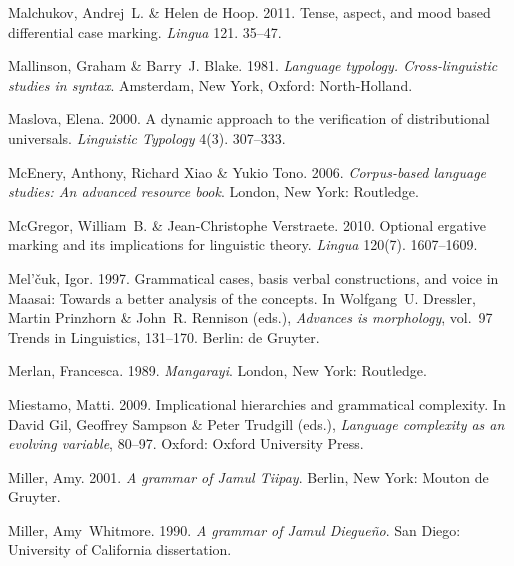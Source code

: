 \documentclass[ number=1
			   ,series=sidl
				,url=http://langsci-press.org/catalog/book/18 
			   ,isbn=978-3-944675-19-0
			   ,output=long   %
			  ]{LSP/langsci}
\begin{document}
\begin{thebibliography}{190}
Malchukov, Andrej~L. \& Helen {de Hoop}. 2011.
\newblock Tense, aspect, and mood based differential case marking.
\newblock \emph{Lingua} 121. 35--47.

Mallinson, Graham \& Barry~J. Blake. 1981.
\newblock \emph{Language typology. {C}ross-linguistic studies in syntax}.
\newblock Amsterdam, New York, Oxford: North-Holland.

Maslova, Elena. 2000.
\newblock A dynamic approach to the verification of distributional universals.
\newblock \emph{Linguistic Typology} 4(3). 307--333.

McEnery, Anthony, Richard Xiao \& Yukio Tono. 2006.
\newblock \emph{Corpus-based language studies: {A}n advanced resource book}.
\newblock London, New York: Routledge.

McGregor, William~B. \& Jean-Christophe Verstraete. 2010.
\newblock Optional ergative marking and its implications for linguistic theory.
\newblock \emph{Lingua} 120(7). 1607--1609.

Mel'\v{c}uk, Igor. 1997.
\newblock Grammatical cases, basis verbal constructions, and voice in {M}aasai:
  {T}owards a better analysis of the concepts.
\newblock In Wolfgang~U. Dressler, Martin Prinzhorn \& John~R. Rennison (eds.),
  \emph{Advances is morphology}, vol.~97 Trends in Linguistics, 131--170.
  Berlin: de Gruyter.

Merlan, Francesca. 1989.
\newblock \emph{{M}angarayi}.
\newblock London, New York: Routledge.
\enlargethispage{\baselineskip}


Miestamo, Matti. 2009.
\newblock Implicational hierarchies and grammatical complexity.
\newblock In David Gil, Geoffrey Sampson \& Peter Trudgill (eds.),
  \emph{Language complexity as an evolving variable}, 80--97. Oxford: Oxford
  University Press.

Miller, Amy. 2001.
\newblock \emph{A grammar of {J}amul {T}iipay}.
\newblock Berlin, New York: Mouton de Gruyter.

Miller, Amy~Whitmore. 1990.
\newblock \emph{A grammar of {J}amul {D}iegue{\~n}o}.
\newblock San Diego: University of California dissertation.


\end{thebibliography}
\end{document}
